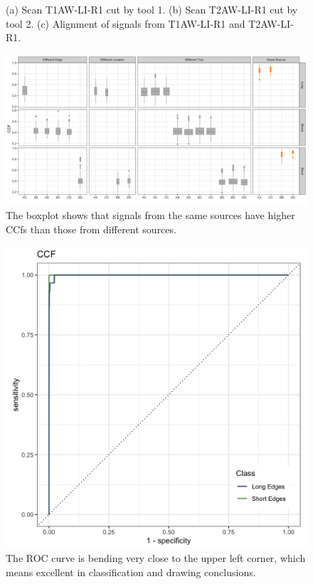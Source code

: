 \documentclass[fleqn,10pt]{wlscirep}
\begin{document}
\begin{figure}
\begin{minipage}{0.90\linewidth}

\subcaption{\label{fig-T1AW-LI-R1-T2AW-LI-R1}}

\end{minipage}%

\caption{\label{fig-T1AW-LI-R1-T2AW-LI-R1-alignment}(a) Scan T1AW-LI-R1
cut by tool 1. (b) Scan T2AW-LI-R1 cut by tool 2. (c) Alignment of
signals from T1AW-LI-R1 and T2AW-LI-R1.}

\end{figure}%

\begin{figure}[ht]
\centering
\includegraphics[width=0.8\linewidth]{ccf_boxplot.png}
\caption{The boxplot shows that signals from the same sources have higher CCfs than those from different sources.}
\label{fig-ccf-boxplot}
\end{figure}

\begin{figure}[ht]
\centering
\includegraphics[width=0.5\linewidth]{ccf_ROC.png}
\caption{The ROC curve is bending very close to the upper left corner, which means excellent in classification and drawing conclusions.}
\label{fig-ccf-ROC}
\end{figure}
\end{document}

